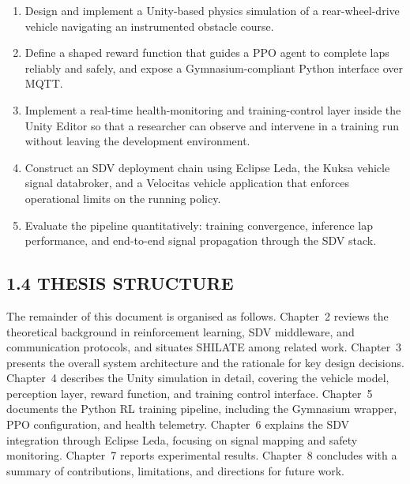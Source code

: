 \documentclass[12pt,a4paper]{article}
\begin{document}
\begin{enumerate}[leftmargin=2.5cm, label=\textbf{O\arabic*.}]
  \item Design and implement a Unity-based physics simulation of a rear-wheel-drive
    vehicle navigating an instrumented obstacle course.
  \item Define a shaped reward function that guides a PPO agent to complete
    laps reliably and safely, and expose a Gymnasium-compliant Python interface
    over MQTT.
  \item Implement a real-time health-monitoring and training-control layer inside
    the Unity Editor so that a researcher can observe and intervene in a training
    run without leaving the development environment.
  \item Construct an SDV deployment chain using Eclipse Leda, the Kuksa vehicle
    signal databroker, and a Velocitas vehicle application that enforces
    operational limits on the running policy.
  \item Evaluate the pipeline quantitatively: training convergence, inference
    lap performance, and end-to-end signal propagation through the SDV stack.
\end{enumerate}

\subsection*{1.4 \quad THESIS STRUCTURE}

\indent The remainder of this document is organised as follows. Chapter~2 reviews the
theoretical background in reinforcement learning, SDV middleware, and
communication protocols, and situates SHILATE among related work. Chapter~3
presents the overall system architecture and the rationale for key design
decisions. Chapter~4 describes the Unity simulation in detail, covering the
vehicle model, perception layer, reward function, and training control
interface. Chapter~5 documents the Python RL training pipeline, including the
Gymnasium wrapper, PPO configuration, and health telemetry. Chapter~6 explains
the SDV integration through Eclipse Leda, focusing on signal mapping and
safety monitoring. Chapter~7 reports experimental results. Chapter~8 concludes
with a summary of contributions, limitations, and directions for future work.

\clearpage

\end{document}
